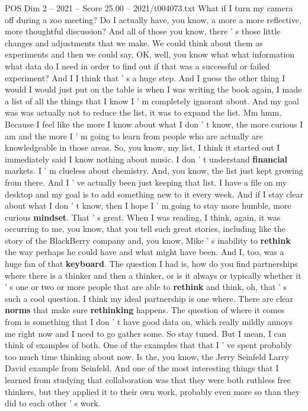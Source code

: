 \begin{textsample}{POS Dim 2 – 2021 – Score 25.00 – 2021/t004073.txt}
What if I turn my camera off during a zoo meeting?
Do I actually have, you know, a more a more reflective, more thoughtful discussion?
And all of those you know, there ' s those little changes and adjustments that we make.
We could think about them as experiments and then we could say, OK, well, you know what what information what data do I need in order to find out if that was a successful or failed experiment?
And I I think that ' s a huge step.
And I guess the other thing I would I would just put on the table is when I was writing the book again, I made a list of all the things that I know I ' m completely ignorant about.
And my goal was was actually not to reduce the list, it was to expand the list.
Mm hmm.
Because I feel like the more I know about what I don ' t know, the more curious I am and the more I ' m going to learn from people who are actually are knowledgeable in those areas.
So, you know, my list, I think it started out I immediately said I know nothing about music.
I don ' t understand \textbf{financial} markets.
I ' m clueless about chemistry.
And, you know, the list just kept growing from there.
And I ' ve actually been just keeping that list.
I have a file on my desktop and my goal is to add something new to it every week.
And if I stay clear about what I don ' t know, then I hope I ' m going to stay more humble, more curious \textbf{mindset}.
That ' s great.
When I was reading, I think, again, it was occurring to me, you know, that you tell such great stories, including like the story of the BlackBerry company and, you know, Mike ' s inability to \textbf{rethink} the way perhaps he could have and what might have been.
And I, too, was a huge fan of that \textbf{keyboard}.
The question I had is, how do you find partnerships where there is a thinker and then a thinker, or is it always or typically whether it ' s one or two or more people that are able to \textbf{rethink} and think, oh, that ' s such a cool question.
I think my ideal partnership is one where.
There are clear \textbf{norms} that make sure \textbf{rethinking} happens.
The question of where it comes from is something that I don ' t have good data on, which really mildly annoys me right now and I need to go gather some.
So stay tuned.
But I mean, I can think of examples of both.
One of the examples that that I ' ve spent probably too much time thinking about now.
Is the, you know, the Jerry Seinfeld Larry David example from Seinfeld.
And one of the most interesting things that I learned from studying that collaboration was that they were both ruthless free thinkers, but they applied it to their own work, probably even more so than they did to each other ' s work.

\end{textsample}
